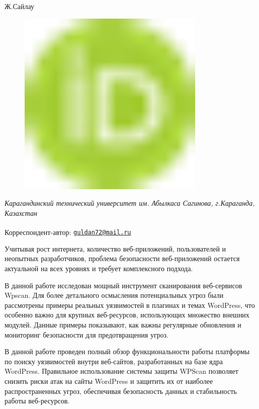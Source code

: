 Ж.Сайлау
\begin{figure}[H]
	\centering
	\includegraphics[width=0.8\textwidth]{media/ict/image1}
	\caption*{}
\end{figure}


\emph{Карагандинский технический университет им. Абылкаса Сагинова,
г.Караганда, Казахстан}

\textsuperscript{\envelope }Корреспондент-автор:
\href{mailto:guldan72@mail.ru}{\nolinkurl{guldan72@mail.ru}}

Учитывая рост интернета, количество веб-приложений, пользователей и
неопытных разработчиков, проблема безопасности веб-приложений остается
актуальной на всех уровнях и требует комплексного подхода.

В данной работе исследован мощный инструмент сканирования веб-сервисов
Wpscan. Для более детального осмысления потенциальных угроз были
рассмотрены примеры реальных уязвимостей в плагинах и темах WordPress,
что особенно важно для крупных веб-ресурсов, использующих множество
внешних модулей. Данные примеры показывают, как важны регулярные
обновления и мониторинг безопасности для предотвращения угроз.

В данной работе проведен полный обзор функциональности работы платформы
по поиску уязвимостей внутри веб-сайтов, разработанных на базе ядра
WordPress. Правильное использование системы защиты WPScan позволяет
снизить риски атак на сайты WordPress и защитить их от наиболее
распространенных угроз, обеспечивая безопасность данных и стабильность
работы веб-ресурсов.

